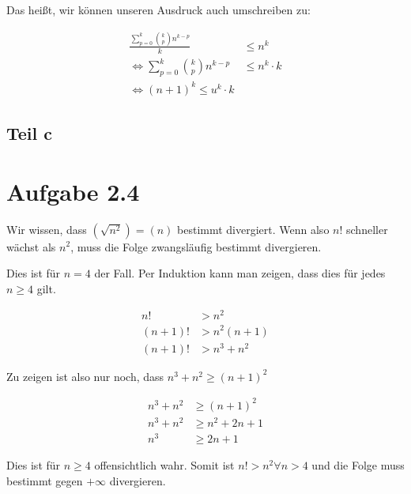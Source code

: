 \documentclass[a4paper,german,12pt,smallheadings]{scrartcl}
\begin{document}
Das heißt, wir können unseren Ausdruck auch umschreiben zu:

\begin{align*}
  \frac{\sum_{p=0}^k {k \choose p} n^{k-p}}{k} &\le n^k \\
  \Leftrightarrow \sum_{p=0}^k {k \choose p} n^{k-p} &\le n^k \cdot k\\
  \Leftrightarrow (n+1)^k \le u^k \cdot k
\end{align*}

\subsection*{Teil c}

\section*{Aufgabe 2.4}
Wir wissen, dass $\left(\sqrt{n^2}\right) = (n)$ bestimmt divergiert. Wenn also
$n!$ schneller wächst als $n^2$, muss die Folge zwangsläufig bestimmt
divergieren.

Dies ist für $n = 4$ der Fall. Per Induktion kann man zeigen, dass dies für
jedes $n \ge 4$ gilt.

\begin{align*}
  n! &> n^2 \\
  (n+1)! &> n^2(n+1) \\
  (n+1)! &> n^3+n^2
\end{align*}

Zu zeigen ist also nur noch, dass $n^3+n^2 \ge (n+1)^2$

\begin{align*}
  n^3+n^2 &\ge (n+1)^2 \\
  n^3+n^2 &\ge n^2+2n+1 \\
  n^3 &\ge 2n+1
\end{align*}

Dies ist für $n \ge 4$ offensichtlich wahr. Somit ist $n! > n^2 \forall n > 4$
und die Folge muss bestimmt gegen $+\infty$ divergieren.
\end{document}
